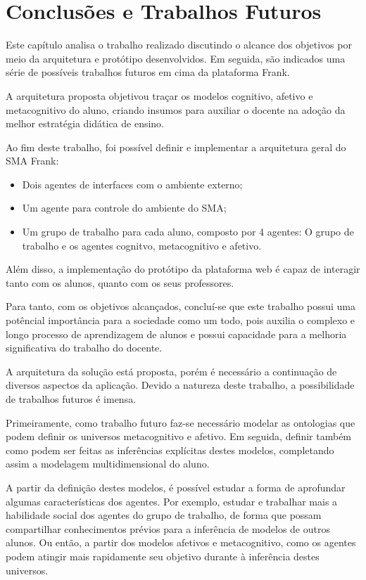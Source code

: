 \chapter{Conclusões e Trabalhos Futuros}
Este capítulo analisa o trabalho realizado discutindo o alcance dos objetivos por meio da arquitetura e protótipo desenvolvidos. Em seguida, são indicados uma série de possíveis trabalhos futuros em cima da plataforma Frank.

A arquitetura proposta objetivou traçar os modelos cognitivo, afetivo e metacognitivo do aluno, criando insumos para auxiliar o docente na adoção da melhor estratégia didática de ensino.

Ao fim deste trabalho, foi possível definir e implementar a arquitetura geral do SMA Frank:
\begin{itemize}
 	\item Dois agentes de interfaces com o ambiente externo;
	\item Um agente para controle do ambiente do SMA;
	\item Um grupo de trabalho para cada aluno, composto por 4 agentes: O grupo de trabalho e os agentes cognitvo, metacognitivo e afetivo.
\end{itemize}

Além disso, a implementação do protótipo da plataforma web é capaz de interagir tanto com os alunos, quanto com os seus professores.

Para tanto, com os objetivos alcançados, concluí-se que este trabalho possui uma potêncial importância para a sociedade como um todo, pois auxilia o complexo e longo processo de aprendizagem de alunos e possui capacidade para a melhoria significativa do trabalho do docente.

A arquitetura da solução está proposta, porém é necessário a continuação de diversos aspectos da aplicação. Devido a natureza deste trabalho, a possibilidade de trabalhos futuros é imensa.

Primeiramente, como trabalho futuro faz-se necessário modelar as ontologias que podem definir os universos metacognitivo e afetivo. Em seguida, definir também como podem ser feitas as inferências explícitas destes modelos, completando assim a modelagem multidimensional do aluno.

A partir da definição destes modelos, é possível estudar a forma de aprofundar algumas características dos agentes. Por exemplo, estudar e trabalhar mais a habilidade social dos agentes do grupo de trabalho, de forma que possam compartilhar conhecimentos prévios para a inferência de modelos de outros alunos. Ou então, a partir dos modelos afetivos e metacognitivo, como os agentes podem atingir mais rapidamente seu objetivo durante à inferência destes universos.

